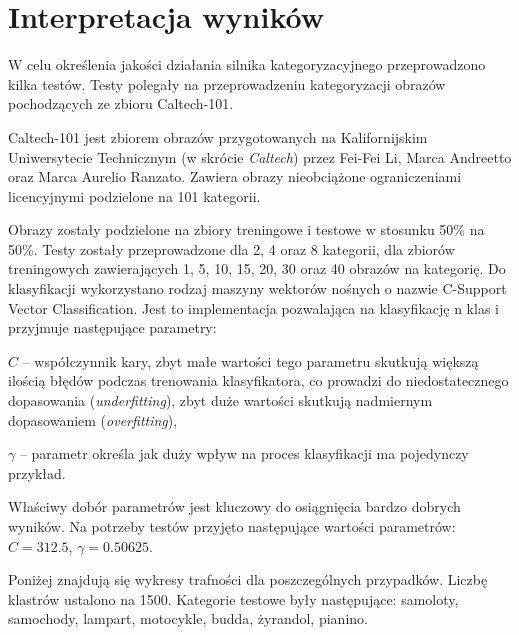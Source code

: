 \chapter{Interpretacja wyników}

W celu określenia jakości działania silnika kategoryzacyjnego przeprowadzono kilka testów. Testy polegały na przeprowadzeniu kategoryzacji obrazów pochodzących ze zbioru Caltech-101.\cite{CALTECH101}

Caltech-101 jest zbiorem obrazów przygotowanych na Kalifornijskim Uniwersytecie Technicznym (w skrócie \emph{Caltech}) przez Fei-Fei Li, Marca Andreetto oraz Marca Aurelio Ranzato. Zawiera obrazy nieobciążone ograniczeniami licencyjnymi podzielone na 101 kategorii.

Obrazy zostały podzielone na zbiory treningowe i testowe w stosunku 50\% na 50\%. Testy zostały przeprowadzone dla 2, 4 oraz 8 kategorii, dla zbiorów treningowych zawierających 1, 5, 10, 15, 20, 30 oraz 40 obrazów na kategorię. Do klasyfikacji wykorzystano rodzaj maszyny wektorów nośnych o nazwie C-Support Vector Classification. Jest to implementacja pozwalająca na klasyfikację n klas i przyjmuje następujące parametry:

\begin{compactitem}
	\item $C$ -- współczynnik kary, zbyt małe wartości tego parametru skutkują większą ilością błędów podczas trenowania klasyfikatora, co prowadzi do niedostatecznego dopasowania (\emph{underfitting}), zbyt duże wartości skutkują nadmiernym dopasowaniem (\emph{overfitting}),
	\item $\gamma$ -- parametr określa jak duży wpływ na proces klasyfikacji ma pojedynczy przykład.
\end{compactitem}

Właściwy dobór parametrów jest kluczowy do osiągnięcia bardzo dobrych wyników. Na potrzeby testów przyjęto następujące wartości parametrów: $C = 312.5$, $\gamma = 0.50625$.

Poniżej znajdują się wykresy trafności dla poszczególnych przypadków. Liczbę klastrów ustalono na 1500. Kategorie testowe były następujące: samoloty, samochody, lampart, motocykle, budda, żyrandol, pianino. 

